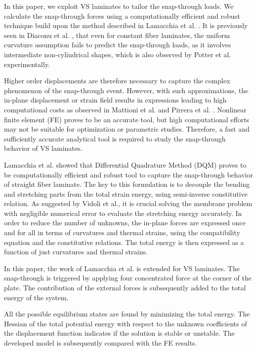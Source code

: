 \documentclass[journal]{new-aiaa}
\begin{document}
In this paper, we exploit VS laminates to tailor the snap-through loads. We calculate the snap-through forces using a computationally efficient and robust technique build upon the method described in Lamacchia et al. \cite{Lamacchia2015}. It is previously seen in Diaconu et al. \cite{Diaconu2009}, that even for constant fiber laminates, the uniform curvature assumption fails to predict the snap-through loads, as it involves intermediate non-cylindrical shapes, which is also observed by Potter et al. 	\cite{Potter2007}experimentally.    

Higher order displacements are therefore necessary to capture the complex phenomenon of the snap-through event. However, with such approximations, the in-plane displacement or strain field results in expressions leading to high computational costs as observed in Mattioni et al. \cite{Mattioni2009} and Pirrera et al. \cite{Pirrera2010}. Nonlinear finite element (FE) proves to be an accurate tool, but high computational efforts may not be suitable for optimization or parametric studies. Therefore, a fast and sufficiently accurate analytical tool is required to study the snap-through behavior of VS laminates.

Lamacchia et al.\cite{Lamacchia2015} showed that Differential Quadrature Method (DQM) proves to be computationally efficient and robust tool to capture the snap-through behavior of straight fiber laminate. The key to this formulation is to decouple the bending and stretching parts from the total strain energy, using semi-inverse constitutive relation. As suggested by Vidoli et al.\cite{Vidoli2013}, it is crucial solving the membrane problem with negligible numerical error to evaluate the stretching energy accurately. In order to reduce the number of unknowns, the in-plane forces are expressed once and for all in terms of curvatures and thermal strains, using the compatibility equation and the constitutive relations. The total energy is then expressed as a function of just curvatures and thermal strains.

In this paper, the work of Lamacchia et al.\cite{Lamacchia2015} is extended for VS laminates.
The snap-through is triggered by applying four concentrated force at the corner of the plate. The contribution of the external forces is subsequently added to the total energy of the system.

All the possible equilibrium states are found by minimizing the total energy. The Hessian of the total potential energy with respect to the unknown coefficients of the displacement function indicates if the solution is stable or unstable. The developed model is subsequently compared with the FE results.
\end{document}
